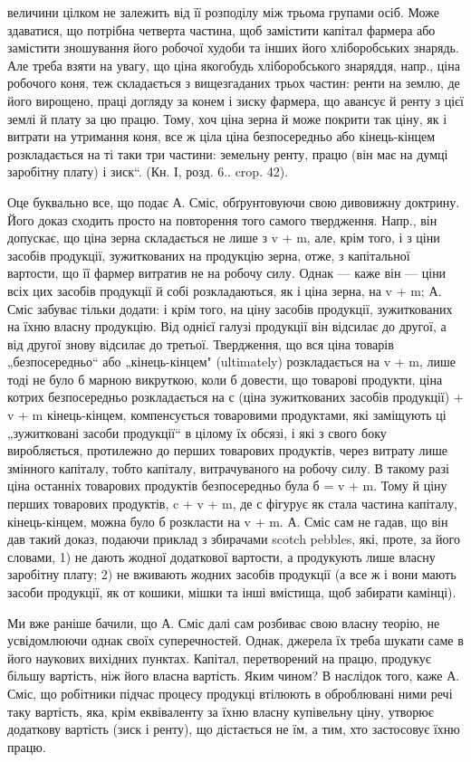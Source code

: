 \parcont{}  %
величини цілком не залежить від її розподілу між трьома групами осіб.
Може здаватися, що потрібна четверта частина, щоб замістити капітал
фармера або замістити зношування його робочої худоби та інших
його хліборобських знарядь. Але треба взяти на увагу, що ціна якогобудь
хліборобського знаряддя, напр., ціна робочого коня, теж складається
з вищезгаданих трьох частин: ренти на землю, де його вирощено,
праці догляду за конем і зиску фармера, що авансує й ренту з цієї
землі й плату за цю працю. Тому, хоч ціна зерна й може покрити так
ціну, як і витрати на утримання коня, все ж ціла ціна безпосередньо
або кінець-кінцем розкладається на ті таки три частини: земельну ренту,
працю (він має на думці заробітну плату) і зиск“. (Кн. І, розд. 6..
crop. 42).

Оце буквально все, що подає А. Сміс, обґрунтовуючи свою дивовижну
доктрину. Його доказ сходить просто на повторення того самого
твердження. Напр., він допускає, що ціна зерна складається не лише з
v + m, але, крім того, і з ціни засобів продукції, зужиткованих на продукцію
зерна, отже, з капітальної вартости, що її фармер витратив не
на робочу силу. Однак — каже він — ціни всіх цих засобів продукції й
собі розкладаються, як і ціна зерна, на v + m; А. Сміс забуває тільки
додати: і крім того, на ціну засобів продукції, зужиткованих на їхню
власну продукцію. Від однієї галузі продукції він відсилає до другої, а
від другої знову відсилає до третьої. Твердження, що вся ціна товарів
„безпосередньо“ або „кінець-кінцем" (ultimately) розкладається на v + m,
лише тоді не було б марною викруткою, коли б довести, що товарові
продукти, ціна котрих безпосередньо розкладається на с (ціна зужиткованих
засобів продукції) + v + m кінець-кінцем, компенсується товаровими
продуктами, які заміщують ці „зужитковані засоби продукції“ в
цілому їх обсязі, і які з свого боку виробляється, протилежно до перших
товарових продуктів, через витрату лише змінного капіталу, тобто
капіталу, витрачуваного на робочу силу. В такому разі ціна останніх
товарових продуктів безпосередньо була б = v + m. Тому й ціну перших
товарових продуктів, c + v + m, де с фігурує як стала частина
капіталу, кінець-кінцем, можна було б розкласти на v + m. А. Сміс сам
не гадав, що він дав такий доказ, подаючи приклад з збирачами scotch
pebbles, які, проте, за його словами, 1) не дають жодної додаткової вартости,
а продукують лише власну заробітну плату; 2) не вживають жодних
засобів продукції (а все ж і вони мають засоби продукції, як от
кошики, мішки та інші вмістища, щоб забирати камінці).

Ми вже раніше бачили, що А. Сміс далі сам розбиває свою власну
теорію, не усвідомлюючи однак своїх суперечностей. Однак, джерела їх
треба шукати саме в його наукових вихідних пунктах. Капітал, перетворений
на працю, продукує більшу вартість, ніж його власна вартість.
Яким чином? В наслідок того, каже А. Сміс, що робітники підчас процесу
продукці втілюють в оброблювані ними речі таку вартість, яка,
крім еквіваленту за їхню власну купівельну ціну, утворює додаткову вартість
(зиск і ренту), що дістається не їм, а тим, хто застосовує їхню працю.
\parbreak{}  %
